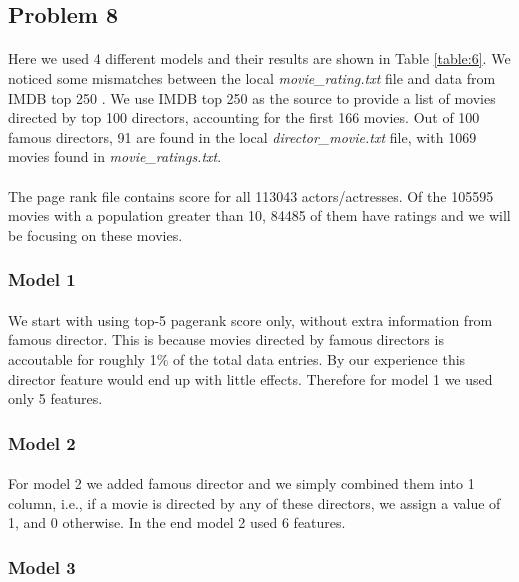 \subsection*{Problem 8}
\paragraph{}
Here we used 4 different models and their results are shown in Table \ref{table:6}. We noticed some mismatches between the local \textit{movie\_rating.txt} file and data from IMDB top 250 \cite{imdb}. We use IMDB top 250 as the source to provide a list of movies directed by top 100 directors, accounting for the first 166 movies. Out of 100 famous directors, 91 are found in the local \textit{director\_movie.txt} file, with 1069 movies found in \textit{movie\_ratings.txt}.
\paragraph{}
The page rank file contains score for all 113043 actors/actresses. Of the 105595 movies with a population greater than 10, 84485 of them have ratings and we will be focusing on these movies.	
\subsubsection*{Model 1}
\paragraph{}
We start with using top-5 pagerank score only, without extra information from famous director. This is because movies directed by famous directors is accoutable for roughly 1\% of the total data entries. By our experience this director feature would end up with little effects. Therefore for model 1 we used only 5 features.
\subsubsection*{Model 2}
\paragraph{}
For model 2 we added famous director and we simply combined them into 1 column, i.e., if a movie is directed by any of these directors, we assign a value of 1, and 0 otherwise. In the end model 2 used 6 features.
\subsubsection*{Model 3}
